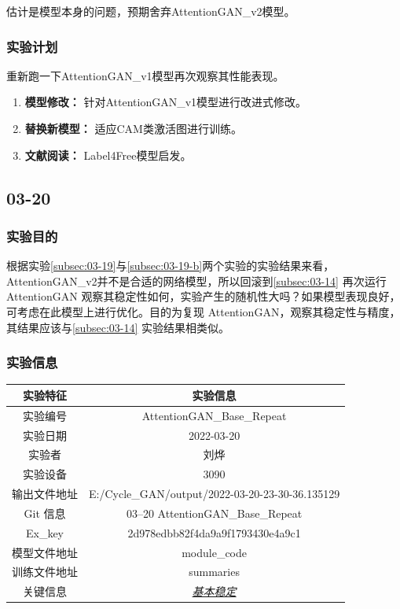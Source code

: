 估计是模型本身的问题，预期舍弃AttentionGAN\_v2模型。

\subsubsection{实验计划}

重新跑一下AttentionGAN\_v1模型再次观察其性能表现。
\begin{enumerate}[1.]
	\item \textbf{模型修改：} 针对AttentionGAN\_v1模型进行改进式修改。
	\item \textbf{替换新模型：} 适应CAM类激活图进行训练。
	\item \textbf{文献阅读：} Label4Free模型启发。
\end{enumerate}

\newpage

\subsection{03-20}

\subsubsection{实验目的}

根据实验\ref{subsec:03-19}与\ref{subsec:03-19-b}两个实验的实验结果来看，AttentionGAN\_v2并不是合适的网络模型，所以回滚到\ref{subsec:03-14}
再次运行 AttentionGAN 观察其稳定性如何，实验产生的随机性大吗？如果模型表现良好，可考虑在此模型上进行优化。目的为复现
AttentionGAN，观察其稳定性与精度，其结果应该与\ref{subsec:03-14} 实验结果相类似。

\subsubsection{实验信息}


\begin{table}[H]
	\centering
	\begin{spacing}{1.5}
		\begin{tabular}{cc}\hline
			实验特征 & 实验信息 \\
			\hline
			实验编号 & AttentionGAN\_Base\_Repeat\\
			实验日期 &  2022-03-20\\
			实验者 & 刘烨\\
			实验设备& 3090\\
			输出文件地址 & E:/Cycle\_GAN/output/2022-03-20-23-30-36.135129\\
			Git 信息 & 03--20 AttentionGAN\_Base\_Repeat\\
			Ex\_key & 2d978edbb82f4da9a9f1793430e4a9c1\\
			模型文件地址 & module\_code\\
			训练文件地址 & summaries\\
			关键信息 & \underline{\emph{基本稳定}}\\\hline
		\end{tabular}
	\end{spacing}
\end{table}


